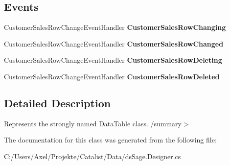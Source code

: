 \subsection*{Events}
\begin{DoxyCompactItemize}
\item 
Customer\+Sales\+Row\+Change\+Event\+Handler {\bfseries Customer\+Sales\+Row\+Changing}\hypertarget{class_products_1_1_data_1_1ds_sage_1_1_customer_sales_data_table_afdec0174394f3d33e9fe6c15498eae36}{}\label{class_products_1_1_data_1_1ds_sage_1_1_customer_sales_data_table_afdec0174394f3d33e9fe6c15498eae36}

\item 
Customer\+Sales\+Row\+Change\+Event\+Handler {\bfseries Customer\+Sales\+Row\+Changed}\hypertarget{class_products_1_1_data_1_1ds_sage_1_1_customer_sales_data_table_a094b009b0771c1e3473fb7b20bd5c215}{}\label{class_products_1_1_data_1_1ds_sage_1_1_customer_sales_data_table_a094b009b0771c1e3473fb7b20bd5c215}

\item 
Customer\+Sales\+Row\+Change\+Event\+Handler {\bfseries Customer\+Sales\+Row\+Deleting}\hypertarget{class_products_1_1_data_1_1ds_sage_1_1_customer_sales_data_table_a32f9af3175d245401eed0f8c7fede009}{}\label{class_products_1_1_data_1_1ds_sage_1_1_customer_sales_data_table_a32f9af3175d245401eed0f8c7fede009}

\item 
Customer\+Sales\+Row\+Change\+Event\+Handler {\bfseries Customer\+Sales\+Row\+Deleted}\hypertarget{class_products_1_1_data_1_1ds_sage_1_1_customer_sales_data_table_a4ad478fb343c96db15608789426c5f84}{}\label{class_products_1_1_data_1_1ds_sage_1_1_customer_sales_data_table_a4ad478fb343c96db15608789426c5f84}

\end{DoxyCompactItemize}


\subsection{Detailed Description}
Represents the strongly named Data\+Table class. /summary$>$ 

The documentation for this class was generated from the following file\+:\begin{DoxyCompactItemize}
\item 
C\+:/\+Users/\+Axel/\+Projekte/\+Catalist/\+Data/ds\+Sage.\+Designer.\+cs\end{DoxyCompactItemize}
